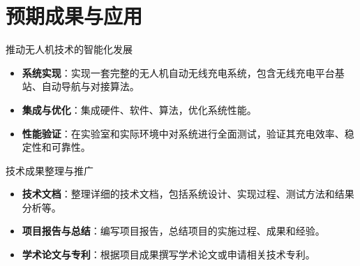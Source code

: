

\section{预期成果与应用}

\begin{frame}
  \begin{block}{推动无人机技术的智能化发展}
      \begin{itemize}
          \item \textbf{系统实现}：实现一套完整的无人机自动无线充电系统，包含无线充电平台基站、自动导航与对接算法。
          \item \textbf{集成与优化}：集成硬件、软件、算法，优化系统性能。
          \item \textbf{性能验证}：在实验室和实际环境中对系统进行全面测试，验证其充电效率、稳定性和可靠性。
      \end{itemize}
  \end{block}
  
  \begin{block}{技术成果整理与推广}
      \begin{itemize}
          \item \textbf{技术文档}：整理详细的技术文档，包括系统设计、实现过程、测试方法和结果分析等。
          \item \textbf{项目报告与总结}：编写项目报告，总结项目的实施过程、成果和经验。
          \item \textbf{学术论文与专利}：根据项目成果撰写学术论文或申请相关技术专利。
      \end{itemize}
  \end{block}
\end{frame}

